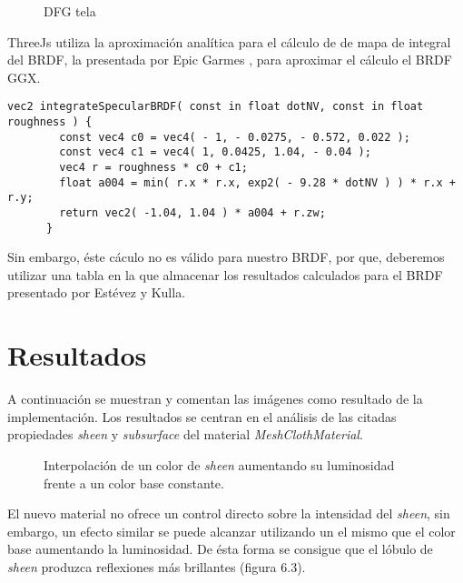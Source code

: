       \begin{figure}[H]
        \vspace{0.5cm}
        \centering
        \caption{DFG tela}
      \end{figure}

      ThreeJs utiliza la aproximaci\'on anal\'itica para el c\'alculo de de mapa de integral del BRDF,
      la presentada por Epic Garmes \autocite{shadingmobile}, para aproximar el c\'alculo el BRDF GGX.\\

      \begin{lstlisting}[caption=Apromixaci\'on anal\'itica a la integral del BRDF en ThreeJs]
      vec2 integrateSpecularBRDF( const in float dotNV, const in float roughness ) {
        const vec4 c0 = vec4( - 1, - 0.0275, - 0.572, 0.022 );
        const vec4 c1 = vec4( 1, 0.0425, 1.04, - 0.04 );
        vec4 r = roughness * c0 + c1;
        float a004 = min( r.x * r.x, exp2( - 9.28 * dotNV ) ) * r.x + r.y;
        return vec2( -1.04, 1.04 ) * a004 + r.zw;
      }
      \end{lstlisting}
      \singlespacing

      Sin embargo, \'este c\'aculo no es v\'alido para nuestro BRDF, por que, deberemos utilizar una
      tabla en la que almacenar los resultados calculados para el BRDF presentado por Est\'evez y Kulla.
    \egroup

\vspace{1cm}
\section{Resultados}

A continuaci\'on se muestran y comentan las im\'agenes como resultado de la implementaci\'on. Los resultados se centran
en el an\'alisis de las citadas propiedades \textit{sheen} y \textit{subsurface} del material \textit{MeshClothMaterial}.

\begin{figure}[H]
  \vspace{0.5cm}
  \centering
  \caption{Interpolaci\'on de un color de \textit{sheen} aumentando su luminosidad frente a un color base constante.}
\end{figure}

El nuevo material no ofrece un control directo sobre la intensidad del \textit{sheen}, sin embargo, un efecto similar se puede
alcanzar utilizando un el mismo que el color base aumentando la luminosidad. De \'esta forma se consigue que el l\'obulo
de \textit{sheen} produzca reflexiones m\'as brillantes (figura 6.3).

